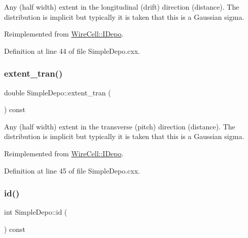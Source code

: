 Any (half width) extent in the longitudinal (drift) direction (distance). The distribution is implicit but typically it is taken that this is a Gaussian sigma. 

Reimplemented from \hyperlink{class_wire_cell_1_1_i_depo_a196f71d7d22bf0b85948e2ff8e557c9c}{Wire\+Cell\+::\+I\+Depo}.



Definition at line 44 of file Simple\+Depo.\+cxx.

\mbox{\label{class_wire_cell_1_1_simple_depo_ac03d9904acf5117c23c363c7168310cd}} 
\subsubsection{\texorpdfstring{extent\+\_\+tran()}{extent\_tran()}}
{\footnotesize\ttfamily double Simple\+Depo\+::extent\+\_\+tran (\begin{DoxyParamCaption}{ }\end{DoxyParamCaption}) const\hspace{0.3cm}{\ttfamily [virtual]}}

Any (half width) extent in the transverse (pitch) direction (distance). The distribution is implicit but typically it is taken that this is a Gaussian sigma. 

Reimplemented from \hyperlink{class_wire_cell_1_1_i_depo_afbb1cebfd10723b572e3959afa665b5e}{Wire\+Cell\+::\+I\+Depo}.



Definition at line 45 of file Simple\+Depo.\+cxx.

\mbox{\label{class_wire_cell_1_1_simple_depo_a30d9b06e6e65bba3d0b4fa17f64c52f5}} 
\subsubsection{\texorpdfstring{id()}{id()}}
{\footnotesize\ttfamily int Simple\+Depo\+::id (\begin{DoxyParamCaption}{ }\end{DoxyParamCaption}) const\hspace{0.3cm}{\ttfamily [virtual]}}



